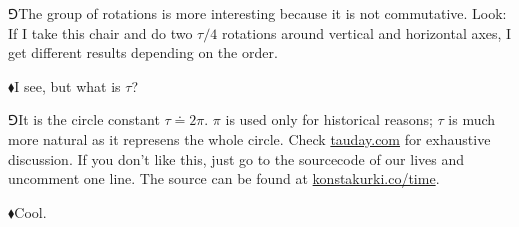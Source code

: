 \documentclass[10pt,oneside%
]{memoir}
\newcommand{\circc}{\tau}
\newcommand{\hea}{\(\blacklozenge\)\;}
\newcommand{\heb}{\(\Game\)\;}
\begin{document}
\heb The group of rotations is more interesting because it is not commutative. Look: If I take this chair and do two \(\circc/4\) rotations around vertical and horizontal axes, I get different results depending on the order.

\hea I see, but what is \(\circc\)?

\heb It is the circle constant \(\circc\doteq2\pi\). \(\pi\) is used only for historical reasons; \(\circc\) is much more natural as it represens the whole circle. Check \url{tauday.com} for exhaustive discussion. If you don't like this, just go to the sourcecode of our lives and uncomment one line. The source can be found at \url{konstakurki.co/time}.

\hea Cool.
\end{document}
